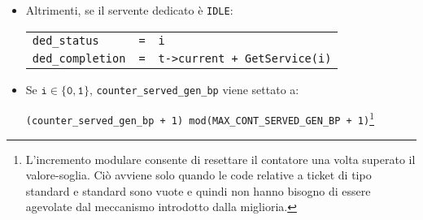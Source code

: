 \begin{enumerate}[label=Step \arabic*), align=left, leftmargin=*]
\begin{itemize}
\begin{itemize}
\begin{center}
\begin{tabular}{l l l}
\end{tabular}
\end{center}
\item Altrimenti, se il servente dedicato è \texttt{IDLE}:
\begin{center}
\begin{tabular}{l l l}
\texttt{ded\_status} & \texttt{=} & \texttt{i} \\
\texttt{ded\_completion} & \texttt{=} & \texttt{t->current + GetService(i)}
\end{tabular}
\end{center}
\item {\color{purple}Se $\mathtt{i \in \lbrace 0, 1 \rbrace}$, \texttt{counter\_served\_gen\_bp} viene settato a:
\begin{center}
\texttt{(counter\_served\_gen\_bp + 1) mod(MAX\_CONT\_SERVED\_GEN\_BP + 1)}\footnote{\label{note:miglioria-modello-computazionale-1}L'incremento modulare consente di resettare il contatore una volta superato il valore-soglia. Ciò avviene solo quando le code relative a ticket di tipo \uo{} standard e \pp{} standard sono vuote e quindi non hanno bisogno di essere agevolate dal meccanismo introdotto dalla miglioria.}
\end{center}}
\end{itemize}


\end{itemize}
\end{enumerate}
